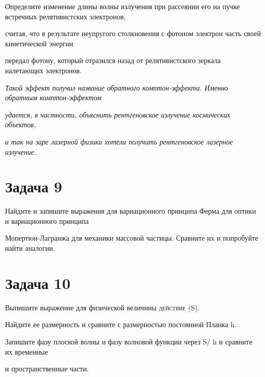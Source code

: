 \documentclass[14pt,a4paper]{article}
\begin{document}
    \par \textsf{Определите изменение длины волны излучения при рассеянии его на пучке встречных релятивистских электронов,}\\
    \par \textsf{считая, что в результате неупругого столкновения с фотоном электрон часть своей кинетической энергии}\\
    \par \textsf{передал фотону, который отразился назад от релятивистского зеркала налетающих электронов.}\\
    \par \textit{Такой эффект получил название обратного комптон-эффекта. Именно обратным комптон-эффектом}\\
    \par \textit{удается, в частности, объяснить рентгеновское излучение космических объектов,}\\
    \par \textit{ и так на заре лазерной физики хотели получить рентгеновское лазерное излучение.}\\
    
    \par 

\section*{Задача 9}
    
    \par \textsf{Найдите и запишите выражения для вариационного принципа Ферма для оптики и вариационного принципа}\\
    \par \textsf{Мопертюи-Лагранжа для механики массовой частицы. Сравните их и попробуйте найти аналогии.}\\
    
    \par 

\section*{Задача 10}
    
    \par \textsf{Выпишите выражение для физической величины \textsc{действие} (S).}\\
    \par \textsf{Найдите ее размерность и сравните с размерностью постоянной Планка h.}\\
    \par \textsf{Запишите фазу плоской волны и фазу волновой функции через S/ h и сравните их временные}\\
    \par \textsf{и пространственные части.}\\
    
\end{document}
